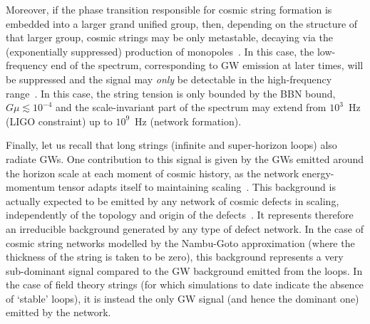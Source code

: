 \documentclass[11pt,a4paper]{article}
\begin{document}
Moreover, if the phase transition responsible for cosmic string formation is embedded into a larger grand unified group, then, depending on the structure of that larger group, cosmic strings may be only metastable, decaying via the (exponentially suppressed) production of monopoles~\cite{Vilenkin:1982hm,Monin:2008mp,Monin:2009ch,Leblond:2009fq}. In this case, the low-frequency end of the spectrum, corresponding to GW emission at later times, will be suppressed and the signal may \textit{only} be detectable in the high-frequency range~\cite{Leblond:2009fq,Dror:2019syi,Buchmuller:2019gfy,Buchmuller:2020lbh}. In this case, the string tension is only bounded by the BBN bound, $G \mu \lesssim 10^{-4}$ and the scale-invariant part of the spectrum may extend from $10^3$~Hz (LIGO constraint) up to $10^9$~Hz (network formation).

Finally, let us recall that long strings (infinite and super-horizon loops) also radiate GWs. One contribution to this signal is given by the GWs emitted around the horizon scale at each moment of cosmic history, as the network energy-momentum tensor adapts itself to maintaining scaling~\cite{Krauss:1991qu,JonesSmith:2007ne,Fenu:2009qf,Figueroa:2012kw,Figueroa:2020lvo}. This background is actually expected to be emitted by any network of cosmic defects in scaling, independently of the topology and origin of the defects~\cite{Figueroa:2012kw}. It represents therefore an irreducible background generated by any type of defect network. In the case of cosmic string networks modelled by the Nambu-Goto approximation (where the thickness of the string is taken to be zero), this background represents a very sub-dominant signal compared to the GW background emitted from the loops. In the case of field theory strings (for which simulations to date indicate the absence of `stable' loops), it is instead the only GW signal (and hence the dominant one) emitted by the network.
\end{document}
